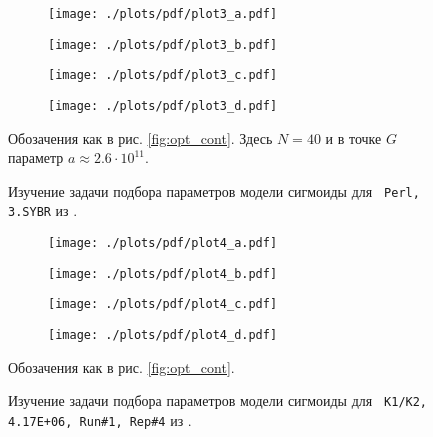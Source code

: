 \begin{figure}
  {\centering

  \begin{subfigure}{\textwidth}
    \centering
    \texttt{[image: ./plots/pdf/plot3\_a.pdf]}
    \caption{}
  \end{subfigure}

  \begin{subfigure}{\textwidth}
    \centering
    \texttt{[image: ./plots/pdf/plot3\_b.pdf]}
    \caption{}
  \end{subfigure}

  \begin{subfigure}{0.49\textwidth}
    \centering
    \texttt{[image: ./plots/pdf/plot3\_c.pdf]}
    \caption{}
  \end{subfigure}
  \hfill
  \begin{subfigure}{0.49\textwidth}
    \centering
    \texttt{[image: ./plots/pdf/plot3\_d.pdf]}
    \caption{}
  \end{subfigure}

  \caption{Изучение задачи подбора параметров модели сигмоиды для {\tt
  Perl, 3.SYBR} из \cite{karlenStatisticalSignificanceQuantitative2007}.}
  \label{fig:opt_cont_2}

  }

  Обозачения как в рис. \ref{fig:opt_cont}. Здесь $N=40$ и в точке $G$ параметр
  $a\approx 2.6\cdot 10^{11}$.
\end{figure}

\begin{figure}
  {\centering
  \begin{subfigure}{\textwidth}
    \centering
    \texttt{[image: ./plots/pdf/plot4\_a.pdf]}
    \caption{}
  \end{subfigure}

  \begin{subfigure}{\textwidth}
    \centering
    \texttt{[image: ./plots/pdf/plot4\_b.pdf]}
    \caption{}
  \end{subfigure}

  \begin{subfigure}{0.49\textwidth}
    \centering
    \texttt{[image: ./plots/pdf/plot4\_c.pdf]}
    \caption{}
  \end{subfigure}
  \hfill
  \begin{subfigure}{0.49\textwidth}
    \centering
    \texttt{[image: ./plots/pdf/plot4\_d.pdf]}
    \caption{}
  \end{subfigure}

  \caption{Изучение задачи подбора параметров модели сигмоиды для {\tt
  K1/K2, 4.17E+06, Run\#1, Rep\#4} из \cite{rutledgeSigmoidalCurvefittingRedefines2004}.}
  \label{fig:opt_cont_3}

  }

  Обозачения как в рис. \ref{fig:opt_cont}.
\end{figure}
